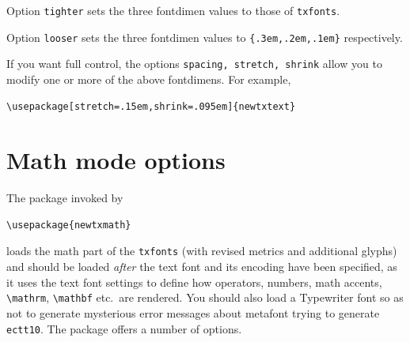 \documentclass[11pt]{article}
\theoremstyle{oldplain}
\theoremstyle{plain}
\begin{document}
Option {\tt tighter} sets the three fontdimen values to those of {\tt txfonts}.  

Option {\tt looser} sets the three fontdimen values to \verb|{.3em,.2em,.1em}| respectively. 

If you want full control, the options {\tt spacing, stretch, shrink} allow you to modify one or more of the above fontdimens. For example,
\begin{verbatim}
\usepackage[stretch=.15em,shrink=.095em]{newtxtext}
\end{verbatim}

\section{Math mode options}
The package invoked by
\begin{verbatim}
\usepackage{newtxmath}
\end{verbatim}
loads the math part of the {\tt txfonts} (with revised metrics and additional glyphs) and should be loaded \emph{after} the text font and its encoding have been specified, as it uses the text font settings to define how operators, numbers, math accents, \verb|\mathrm|, \verb|\mathbf| etc.\ are rendered. You should also load a Typewriter font so as not to generate mysterious error messages about \textsf{metafont} trying to generate \texttt{ectt10}. The package offers a number of options.
\end{document}
